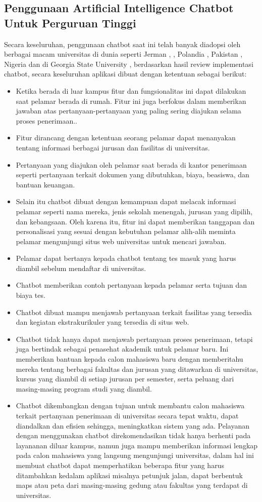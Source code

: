 \documentclass[conference]{IEEEtran}
\begin{document}
\subsection{Penggunaan Artificial Intelligence Chatbot Untuk Perguruan Tinggi}
Secara keseluruhan, penggunaan chatbot saat ini telah banyak diadopsi oleh berbagai macam universitas di dunia seperti Jerman \cite{b26}, \cite{b19}, Polandia \cite{b21}, Pakistan \cite{b28}, Nigeria \cite{b21} dan di Georgia State University \cite{b29}, berdasarkan hasil review implementasi chatbot, secara keseluruhan aplikasi dibuat dengan ketentuan sebagai berikut:
\begin{itemize}
\item Ketika berada di luar kampus fitur dan fungsionalitas ini dapat dilakukan saat pelamar berada di rumah. Fitur ini juga berfokus dalam memberikan jawaban atas pertanyaan-pertanyaan yang paling sering diajukan selama proses penerimaan..
\item Fitur dirancang dengan ketentuan seorang pelamar dapat menanyakan tentang informasi berbagai jurusan dan fasilitas di universitas.
\item Pertanyaan yang diajukan oleh pelamar saat berada di kantor penerimaan seperti pertanyaan terkait dokumen yang dibutuhkan, biaya, beasiswa, dan bantuan keuangan.
\item Selain itu chatbot dibuat dengan kemampuan dapat melacak informasi pelamar seperti nama mereka, jenis sekolah menengah, jurusan yang dipilih, dan kebangsaan. Oleh karena itu, fitur ini dapat memberikan tanggapan dan personalisasi yang sesuai dengan kebutuhan pelamar alih-alih meminta pelamar mengunjungi situs web universitas untuk mencari jawaban. 
\item Pelamar dapat bertanya kepada chatbot tentang tes masuk yang harus diambil sebelum mendaftar di universitas.  
\item Chatbot memberikan contoh pertanyaan kepada pelamar serta tujuan dan biaya tes.
\item Chatbot dibuat mampu menjawab pertanyaan terkait fasilitas yang tersedia dan kegiatan ekstrakurikuler yang tersedia di situs web.
\item Chatbot tidak hanya dapat menjawab pertanyaan proses penerimaan, tetapi juga bertindak sebagai penasehat akademik untuk pelamar baru. Ini memberikan bantuan kepada calon mahasiswa baru dengan memberitahu mereka tentang berbagai fakultas dan jurusan yang ditawarkan di universitas, kursus yang diambil di setiap jurusan per semester, serta peluang dari masing-masing program studi yang diambil. 
\item Chatbot dikembangkan dengan tujuan untuk membantu calon mahasiswa terkait pertanyaan penerimaan di universitas secara tepat waktu, dapat diandalkan dan efisien sehingga, meningkatkan sistem yang ada.
Pelayanan dengan menggunakan chatbot direkomendasikan tidak hanya berhenti pada layananan diluar kampus, namun juga mampu memberikan informasi lengkap pada calon mahasiswa yang langsung mengunjungi universitas, dalam hal ini membuat chatbot dapat memperhatikan beberapa fitur yang harus ditambahkan kedalam aplikasi misalnya petunjuk jalan, dapat berbentuk maps atau peta dari masing-masing gedung atau fakultas yang terdapat di universitas.
\end{itemize}
\end{document}
